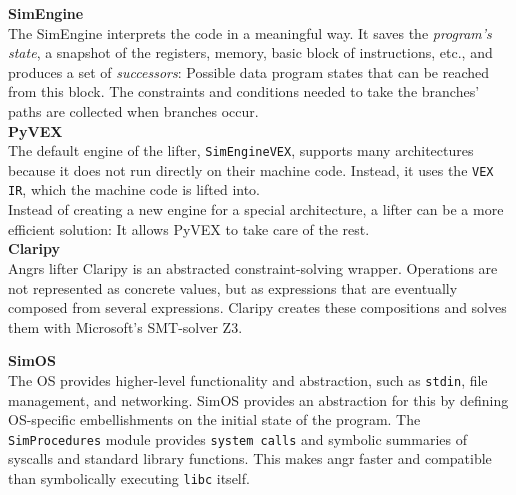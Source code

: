 \documentclass[seminar]{plai}
\begin{document}
\textbf{SimEngine}\\
The SimEngine interprets the code in a meaningful way. It saves the \textit{program's state}, a snapshot of the registers, memory, basic block of instructions, etc., and produces a set of \textit{successors}: Possible data program states that can be reached from this block.
The constraints and conditions needed to take the branches' paths are collected when branches occur.\\

\textbf{PyVEX}\\
The default engine of the lifter, \texttt{SimEngineVEX}, supports many architectures because it does not run directly on their machine code. Instead, it uses the \texttt{VEX IR}, which the machine code is lifted into.\cite{angr-internals}\\
Instead of creating a new engine for a special architecture, a lifter can be a more efficient solution: It allows PyVEX to take care of the rest.\cite{art-of-war-angr}\\

\textbf{Claripy}\\
Angrs lifter Claripy is an abstracted constraint-solving wrapper.\cite{claripy-documentation} Operations are not represented as concrete values, but as expressions that are eventually composed from several expressions. Claripy creates these compositions and solves them with Microsoft's SMT-solver Z3.\cite{angr-internals}

\textbf{SimOS}\\
The OS provides higher-level functionality and abstraction, such as \texttt{stdin}, file management, and networking. SimOS provides an abstraction for this by defining OS-specific embellishments on the initial state of the program. The \texttt{SimProcedures} module provides \texttt{system calls} and symbolic summaries of syscalls and standard library functions.
This makes angr faster and compatible than symbolically executing \texttt{libc} itself.
\end{document}
